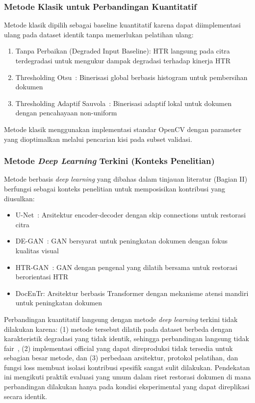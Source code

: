 \documentclass[journal]{IEEEtran}
\begin{document}
\subsubsection{Metode Klasik untuk Perbandingan Kuantitatif}

Metode klasik dipilih sebagai baseline kuantitatif karena dapat diimplementasi ulang pada dataset identik tanpa memerlukan pelatihan ulang:

\begin{enumerate}
    \item Tanpa Perbaikan (Degraded Input Baseline): HTR langsung pada citra terdegradasi untuk mengukur dampak degradasi terhadap kinerja HTR
    \item Thresholding Otsu~\cite{otsu1979threshold}: Binerisasi global berbasis histogram untuk pembersihan dokumen
    \item Thresholding Adaptif Sauvola~\cite{sauvola2000adaptive}: Binerisasi adaptif lokal untuk dokumen dengan pencahayaan non-uniform
\end{enumerate}

Metode klasik menggunakan implementasi standar OpenCV dengan parameter yang dioptimalkan melalui pencarian kisi pada subset validasi.

\subsubsection{Metode \textit{Deep Learning} Terkini (Konteks Penelitian)}

Metode berbasis \textit{deep learning} yang dibahas dalam tinjauan literatur (Bagian II) berfungsi sebagai konteks penelitian untuk memposisikan kontribusi yang diusulkan:

\begin{itemize}
    \item U-Net~\cite{ronneberger2015unet}: Arsitektur encoder-decoder dengan skip connections untuk restorasi citra
    \item DE-GAN~\cite{souibgui2020degan}: GAN bersyarat untuk peningkatan dokumen dengan fokus kualitas visual
    \item HTR-GAN~\cite{souibgui2021enhance}: GAN dengan pengenal yang dilatih bersama untuk restorasi berorientasi HTR
    \item DocEnTr: Arsitektur berbasis Transformer dengan mekanisme atensi mandiri untuk peningkatan dokumen
\end{itemize}

Perbandingan kuantitatif langsung dengan metode \textit{deep learning} terkini tidak dilakukan karena: (1) metode tersebut dilatih pada dataset berbeda dengan karakteristik degradasi yang tidak identik, sehingga perbandingan langsung tidak fair~\cite{tensmeyer2017document}, (2) implementasi official yang dapat direproduksi tidak tersedia untuk sebagian besar metode, dan (3) perbedaan arsitektur, protokol pelatihan, dan fungsi loss membuat isolasi kontribusi spesifik sangat sulit dilakukan. Pendekatan ini mengikuti praktik evaluasi yang umum dalam riset restorasi dokumen di mana perbandingan dilakukan hanya pada kondisi eksperimental yang dapat direplikasi secara identik.
\end{document}
